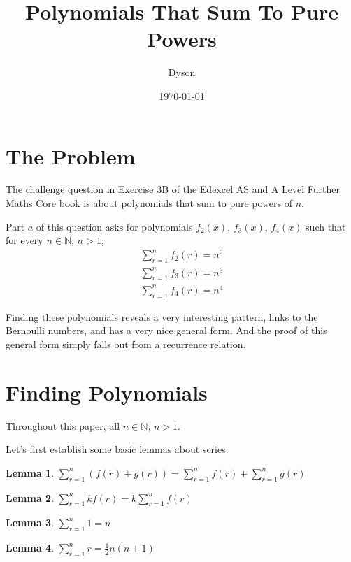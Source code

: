 \documentclass[a4paper]{article}
\title{Polynomials That Sum To Pure Powers}
\author{Dyson}
\date{\today}
\newcommand{\sn}{\sum\limits_{r=1}^{n}}
\newcommand{\inn}{\in \mathbb{N}}
\newcommand{\oo}[1]{\frac{1}{#1}}
\newtheorem{lemma}{Lemma}
\begin{document}
\maketitle

\setlength{\parindent}{0em}
\setlength{\parskip}{1em}

\section{The Problem}

The challenge question in Exercise 3B of the Edexcel AS and A Level Further Maths Core book is about polynomials that sum to pure powers of $n$.

Part $a$ of this question asks for polynomials $f_2(x)$, $f_3(x)$, $f_4(x)$ such that for every $n \inn$, $n > 1$,
\begin{gather*}
\sn f_2(r) = n^2\\[0.3em]
\sn f_3(r) = n^3\\[0.3em]
\sn f_4(r) = n^4
\end{gather*}

Finding these polynomials reveals a very interesting pattern, links to the Bernoulli numbers, and has a very nice general form. And the proof of this general form simply falls out from a recurrence relation.

\section{Finding Polynomials}

Throughout this paper, all $n \inn$, $n > 1$.

Let's first establish some basic lemmas about series.

\begin{lemma}
$\displaystyle \sn (f(r) + g(r)) = \sn f(r) + \sn g(r)$
\label{lem:add}
\end{lemma}

\begin{lemma}
$\displaystyle \sn kf(r) = k \sn f(r)$
\label{lem:mult}
\end{lemma}

\begin{lemma}
$\displaystyle \sn 1 = n$
\label{lem:sum_1}
\end{lemma}

\begin{lemma}
$\displaystyle \sn r = \oo{2}n(n + 1)$
\label{lem:sum_r}
\end{lemma}
\end{document}
